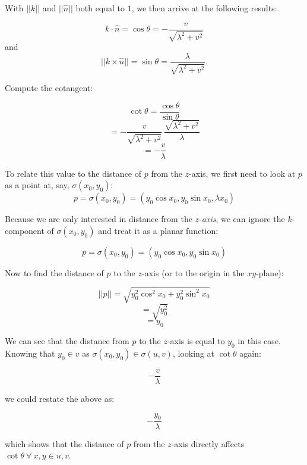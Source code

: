 \documentclass[12pt]{article}
\newcommand{\norm}[1]
{
||#1||
}
\begin{document}
With $\norm{k}$ and $\norm{\hat{n}}$ both equal to $1$, we then arrive at the following results: 

$$
k \cdot \hat{n} = \cos \theta = -\frac{v}{\sqrt{\lambda^2+v^2}}
$$
and
$$
\norm{k \times \hat{n}} = \sin \theta  = \frac{\lambda}{\sqrt{\lambda^2+v^2}}.
$$

Compute the cotangent:

$$
\cot \theta = \frac{\cos \theta}{\sin \theta}
$$
$$
 = -\frac{v}{\sqrt{\lambda^2+v^2}} \ \frac{\sqrt{\lambda^2+v^2}}{\lambda}
$$
$$
= -\frac{v}{\lambda}
$$

To relate this value to the distance of $p$ from the $z$-axis, we first need to look at $p$ as a point at, say, $\sigma(x_0,y_0)$:
$$
p = \sigma(x_0,y_0) = (y_0 \cos x_0,y_0 \sin x_0,\lambda x_0)
$$

Because we are only interested in distance from the $z$-\emph{axis}, we can ignore the $k$-component of $\sigma(x_0,y_0)$ and treat it as a planar function:

$$
p = \sigma(x_0,y_0) = (y_0 \cos x_0,y_0 \sin x_0)
$$

Now to find the distance of $p$ to the $z$-axis (or to the origin in the $xy$-plane):

$$
\norm{p} = \sqrt{y_0^2 \cos^2x_0 + y_0^2 \sin^2 x_0}
$$
$$
= \sqrt{y_0^2}
$$
$$
= y_0
$$

\clearpage

We can see that the distance from $p$ to the $z$-axis is equal to $y_0$ in this case. Knowing that $y_0 \in v$ as $\sigma(x_0,y_0) \in \sigma(u,v)$, looking at $\cot \theta$ again:

$$
-\frac{v}{\lambda}
$$

we could restate the above as:

$$
-\frac{y_0}{\lambda}
$$

which shows that the distance of $p$ from the $z$-axis directly affects $\cot \theta \ \forall \ x,y \in u,v$.
\end{document}
